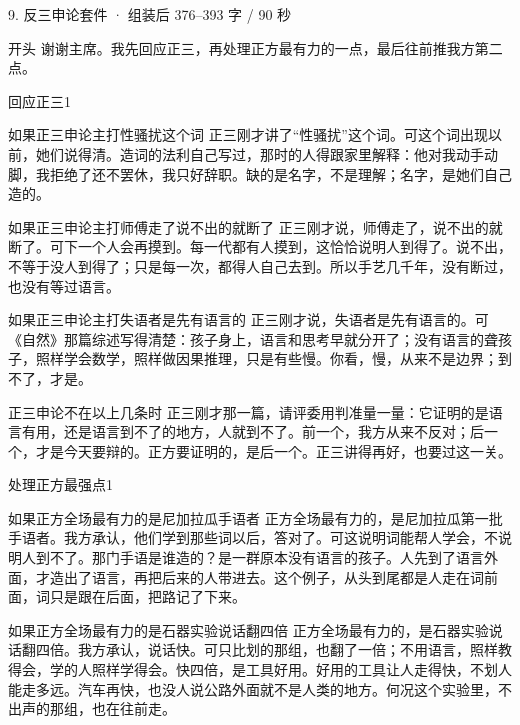 \documentclass[script,con]{debate}
\begin{document}
\begin{kit}{9. 反三申论}{套件 · 组装后 376–393 字 / 90 秒}
\begin{fixed}{开头}
谢谢主席。我先回应正三，再处理正方最有力的一点，最后往前推我方第二点。
\end{fixed}
\begin{pick}{回应正三}{1}
\begin{module}{如果正三申论主打性骚扰这个词}
正三刚才讲了“性骚扰”这个词。可这个词出现以前，她们说得清。造词的法利自己写过，那时的人得跟家里解释：他对我动手动脚，我拒绝了还不罢休，我只好辞职。缺的是名字，不是理解；名字，是她们自己造的。
\end{module}
\begin{module}{如果正三申论主打师傅走了说不出的就断了}
正三刚才说，师傅走了，说不出的就断了。可下一个人会再摸到。每一代都有人摸到，这恰恰说明人到得了。说不出，不等于没人到得了；只是每一次，都得人自己去到。所以手艺几千年，没有断过，也没有等过语言。
\end{module}
\begin{module}{如果正三申论主打失语者是先有语言的}
正三刚才说，失语者是先有语言的。可《自然》那篇综述写得清楚：孩子身上，语言和思考早就分开了；没有语言的聋孩子，照样学会数学，照样做因果推理，只是有些慢。你看，慢，从来不是边界；到不了，才是。
\end{module}
\begin{fallback}{正三申论不在以上几条时}
正三刚才那一篇，请评委用判准量一量：它证明的是语言有用，还是语言到不了的地方，人就到不了。前一个，我方从来不反对；后一个，才是今天要辩的。正方要证明的，是后一个。正三讲得再好，也要过这一关。
\end{fallback}
\end{pick}
\begin{pick}{处理正方最强点}{1}
\begin{module}{如果正方全场最有力的是尼加拉瓜手语者}
正方全场最有力的，是尼加拉瓜第一批手语者。我方承认，他们学到那些词以后，答对了。可这说明词能帮人学会，不说明人到不了。那门手语是谁造的？是一群原本没有语言的孩子。人先到了语言外面，才造出了语言，再把后来的人带进去。这个例子，从头到尾都是人走在词前面，词只是跟在后面，把路记了下来。
\end{module}
\begin{module}{如果正方全场最有力的是石器实验说话翻四倍}
正方全场最有力的，是石器实验说话翻四倍。我方承认，说话快。可只比划的那组，也翻了一倍；不用语言，照样教得会，学的人照样学得会。快四倍，是工具好用。好用的工具让人走得快，不划人能走多远。汽车再快，也没人说公路外面就不是人类的地方。何况这个实验里，不出声的那组，也在往前走。

\end{module}
\end{pick}
\end{kit}
\end{document}
